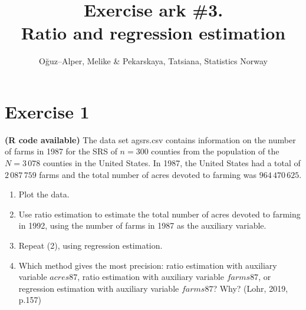 \documentclass[12pt]{article}
\begin{document}
\title{Exercise ark \#3.\\ Ratio and regression estimation}
\author{O\u{g}uz--Alper, Melike \& Pekarskaya, Tatsiana, Statistics Norway}
\maketitle

\section*{Exercise 1}
\textbf{\color{ForestGreen}(R code available)} The data set agsrs.csv contains information on the number of farms in 1987 for the SRS of $n = 300$ counties from the population of the $N = 3\,078$ counties in the
United States. In 1987, the United States had a total of $2\,087\,759$ farms and the total number of acres devoted to farming was $964\,470\,625$.
\begin{enumerate}
\item Plot the data.
\item Use ratio estimation to estimate the total number of acres devoted to farming in
1992, using the number of farms in 1987 as the auxiliary variable.
\item Repeat (2), using regression estimation.
\item Which method gives the most precision: ratio estimation with auxiliary variable
$acres87$, ratio estimation with auxiliary variable $farms87$, or regression estimation
with auxiliary variable $farms87$? Why? \hfill (Lohr, 2019, p.157)\\
\end{enumerate}
\end{document}
